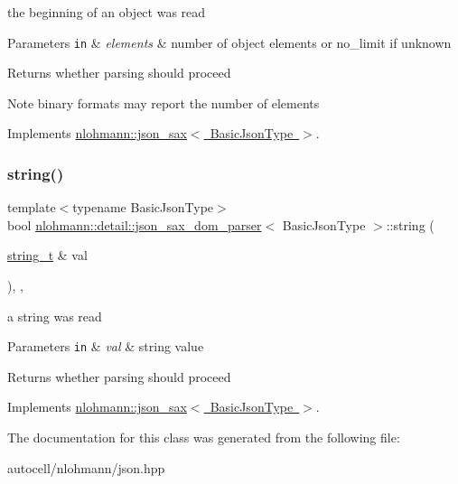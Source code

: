 the beginning of an object was read 


\begin{DoxyParams}[1]{Parameters}
\mbox{\tt in}  & {\em elements} & number of object elements or no\+\_\+limit if unknown \\
\hline
\end{DoxyParams}
\begin{DoxyReturn}{Returns}
whether parsing should proceed 
\end{DoxyReturn}
\begin{DoxyNote}{Note}
binary formats may report the number of elements 
\end{DoxyNote}


Implements \mbox{\hyperlink{structnlohmann_1_1json__sax_a447db60efaabc614492c449e640719cf}{nlohmann\+::json\+\_\+sax$<$ Basic\+Json\+Type $>$}}.

\mbox{\label{classnlohmann_1_1detail_1_1json__sax__dom__parser_a1c0e1e24fb803e358f63fcb5c1d1e4ee}} 
\subsubsection{\texorpdfstring{string()}{string()}}
{\footnotesize\ttfamily template$<$typename Basic\+Json\+Type$>$ \\
bool \mbox{\hyperlink{classnlohmann_1_1detail_1_1json__sax__dom__parser}{nlohmann\+::detail\+::json\+\_\+sax\+\_\+dom\+\_\+parser}}$<$ Basic\+Json\+Type $>$\+::string (\begin{DoxyParamCaption}\item[{\mbox{\hyperlink{structnlohmann_1_1json__sax_ae01977a9f3c5b3667b7a2929ed91061e}{string\+\_\+t}} \&}]{val }\end{DoxyParamCaption})\hspace{0.3cm}{\ttfamily [inline]}, {\ttfamily [override]}, {\ttfamily [virtual]}}



a string was read 


\begin{DoxyParams}[1]{Parameters}
\mbox{\tt in}  & {\em val} & string value \\
\hline
\end{DoxyParams}
\begin{DoxyReturn}{Returns}
whether parsing should proceed 
\end{DoxyReturn}


Implements \mbox{\hyperlink{structnlohmann_1_1json__sax_a07eab82f6c82d606787eee9ad73d2bda}{nlohmann\+::json\+\_\+sax$<$ Basic\+Json\+Type $>$}}.



The documentation for this class was generated from the following file\+:\begin{DoxyCompactItemize}
\item 
autocell/nlohmann/json.\+hpp\end{DoxyCompactItemize}
